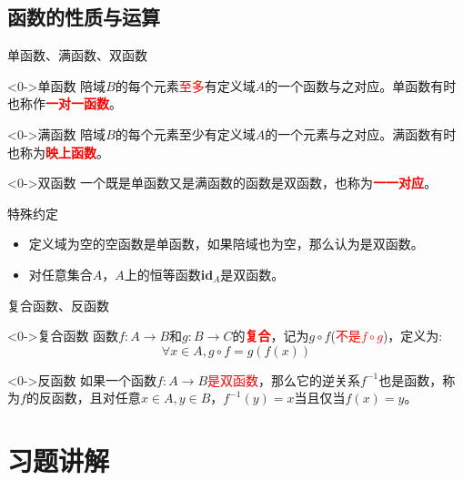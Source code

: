 \documentclass[xetex,10pt,aspectratio=43]{beamer}
\begin{document}
\subsection{函数的性质与运算}

\begin{frame}{单函数、满函数、双函数}
	\begin{block}<0->{单函数}
		陪域$B$的每个元素\textcolor{red}{至多}有定义域$A$的一个函数与之对应。单函数有时也称作\textcolor{red}{\textbf{一对一函数}}。
	\end{block}
	
	\begin{block}<0->{满函数}
		陪域$B$的每个元素至少有定义域$A$的一个元素与之对应。满函数有时也称为\textcolor{red}{\textbf{映上函数}}。
	\end{block}
	
	\begin{block}<0->{双函数}
		一个既是单函数又是满函数的函数是双函数，也称为\textcolor{red}{\textbf{一一对应}}。
	\end{block}
\end{frame}

\begin{frame}{特殊约定}
	\begin{itemize}
		\item<0-> 定义域为空的空函数是单函数，如果陪域也为空，那么认为是双函数。
		\item<0-> 对任意集合$A$，$A$上的恒等函数\textbf{id}$_{A}$是双函数。
	\end{itemize}
\end{frame}

\begin{frame}{复合函数、反函数}
	\begin{block}<0->{复合函数}
		函数$f:A\rightarrow B$和$g:B\rightarrow C$的\textcolor{red}{\textbf{复合}}，记为$g\circ f$\;(\textcolor{red}{不是$f\circ g$})，定义为:$$\forall x\in A,g\circ f = g(f(x))$$
	\end{block}

	\begin{block}<0->{反函数}
		如果一个函数$f:A\rightarrow B$\textcolor{red}{是双函数}，那么它的逆关系$f^{-1}$也是函数，称为$f$的反函数，且对任意$x\in A,y\in B$，$f^{-1}(y)=x$当且仅当$f(x)=y$。
	\end{block}
\end{frame}

\section{习题讲解}
\end{document}

